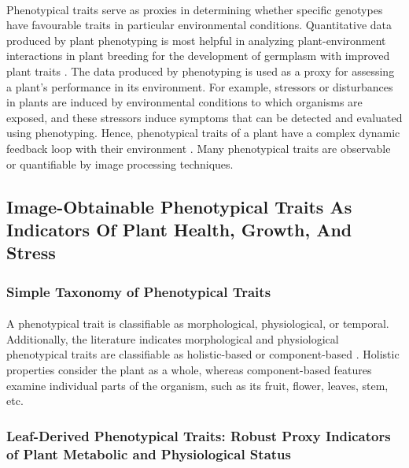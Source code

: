 \paragraph{}
Phenotypical traits serve as proxies in determining whether specific genotypes have favourable traits in particular environmental conditions. Quantitative data produced by plant phenotyping is most helpful in analyzing plant-environment interactions in plant breeding \cite{fioraniFutureScenariosPlant2013} for the development of germplasm with improved plant traits \cite{liReviewImagingTechniques2014}. The data produced by phenotyping is used as a proxy for assessing a plant's performance in its environment. For example, stressors or disturbances in plants are induced by environmental conditions to which organisms are exposed, and these stressors induce symptoms that can be detected and evaluated using phenotyping. Hence, phenotypical traits of a plant have a complex dynamic feedback loop with their environment \cite{walterPlantPhenotypingBean2015}. Many phenotypical traits are observable or quantifiable by image processing techniques.

\subsection{Image-Obtainable Phenotypical Traits As Indicators Of Plant Health, Growth, And Stress}

\subsubsection{Simple Taxonomy of Phenotypical Traits}
\paragraph{}
A phenotypical trait is classifiable as morphological, physiological, or temporal. Additionally, the literature indicates morphological and physiological phenotypical traits are classifiable as holistic-based or component-based \cite{daschoudhuryLeveragingImageAnalysis2019}. Holistic properties consider the plant as a whole, whereas component-based features examine individual parts of the organism, such as its fruit, flower, leaves, stem, etc. 

\subsubsection{Leaf-Derived Phenotypical Traits: Robust Proxy Indicators of Plant Metabolic and Physiological Status}
